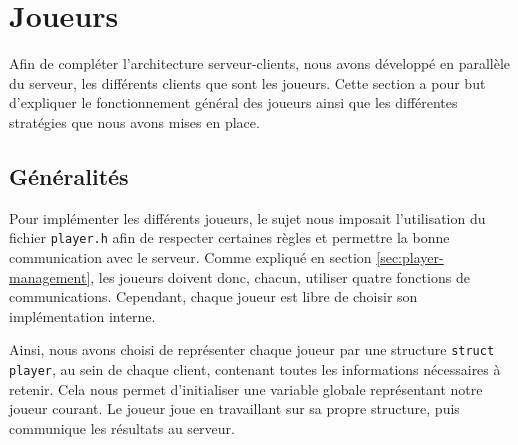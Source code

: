 \documentclass[11pt]{article}
\begin{document}
\newpage
\section{Joueurs}
Afin de compléter l'architecture serveur-clients, nous avons développé en parallèle du serveur, les différents clients que sont les joueurs. Cette section a pour but d'expliquer le fonctionnement général des joueurs ainsi que les différentes stratégies que nous avons mises en place.

\subsection{Généralités}

Pour implémenter les différents joueurs, le sujet nous imposait l'utilisation du fichier \texttt{player.h} afin de respecter certaines règles et permettre la bonne communication avec le serveur. Comme expliqué en section \ref{sec:player-management}, les joueurs doivent donc, chacun, utiliser quatre fonctions de communications. Cependant, chaque joueur est libre de choisir son implémentation interne.

\noindent Ainsi, nous avons choisi de représenter chaque joueur par une structure \texttt{struct player}, au sein de chaque client, contenant toutes les informations nécessaires à retenir. Cela nous permet d'initialiser une variable globale représentant notre joueur courant. Le joueur joue en travaillant sur sa propre structure, puis communique les résultats au serveur. \\
\end{document}
